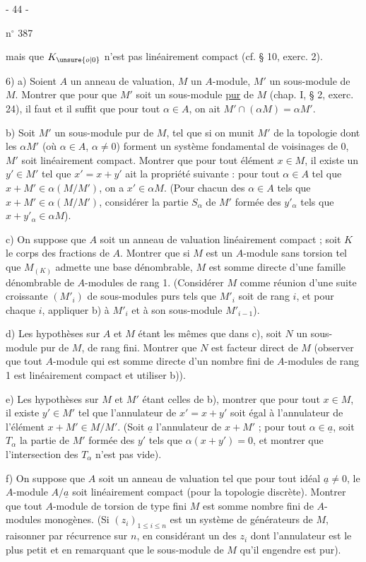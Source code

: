 \begin{center}- 44 -\end{center}
\hfill n$^\circ$ 387

mais que $K_{\unsure{o|0}}$ n'est pas linéairement compact (cf. § 10, exerc. 2).

6) a) Soient $A$ un anneau de valuation, $M$ un $A$-module, $M'$ un sous-module de $M$. Montrer que pour que $M'$ soit un sous-module \uline{pur} de $M$ (chap. I, § 2, exerc. 24), il faut et il suffit que pour tout $\alpha\in A$, on ait $M'\cap(\alpha M)=\alpha M'$.

b) Soit $M'$ un sous-module pur de $M$, tel que si on munit $M'$ de la topologie dont les $\alpha M'$ (où $\alpha\in A$, $\alpha\ne0$) forment un système fondamental de voisinages de $0$, $M'$ soit linéairement compact. Montrer que pour tout élément $x\in M$, il existe un $y'\in M'$ tel que $x'=x+y'$ ait la propriété suivante : pour tout $\alpha\in A$ tel que $x+M'\in\alpha(M/M')$, on a $x'\in\alpha M$. (Pour chacun des $\alpha\in A$ tels que $x+M'\in\alpha(M/M')$, considérer la partie $S_\alpha$ de $M'$ formée des $y'_\alpha$ tels que $x+y'_\alpha\in\alpha M$).

c) On suppose que $A$ soit un anneau de valuation linéairement compact ; soit $K$ le corps des fractions de $A$. Montrer que si $M$ est un $A$-module sans torsion tel que $M_{(K)}$ admette une base dénombrable, $M$ est somme directe d'une famille dénombrable de $A$-modules de rang 1. (Considérer $M$ comme réunion d'une suite croissante $(M'_i)$ de sous-modules purs tels que $M'_i$ soit de rang $i$, et pour chaque $i$, appliquer b) à $M'_i$ et à son sous-module $M'_{i-1}$).

d) Les hypothèses sur $A$ et $M$ étant les mêmes que dans c), soit $N$ un sous-module pur de $M$, de rang fini. Montrer que $N$ est facteur direct de $M$ (observer que tout $A$-module qui est somme directe d'un nombre fini de $A$-modules de rang 1 est linéairement compact et utiliser b)).

e) Les hypothèses sur $M$ et $M'$ étant celles de b), montrer que pour tout $x\in M$, il existe $y'\in M'$ tel que l'annulateur de $x'=x+y'$ soit égal à l'annulateur de l'élément $x+M'\in M/M'$. (Soit $\underline a$ l'annulateur de $x+M'$ ; pour tout $\alpha\in\underline a$, soit $T_\alpha$ la partie de $M'$ formée des $y'$ tels que $\alpha(x+y')=0$, et montrer que l'intersection des $T_\alpha$ n'est pas vide).

f) On suppose que $A$ soit un anneau de valuation tel que pour tout idéal $\underline a\ne0$, le $A$-module $A/\underline a$ soit linéairement compact (pour la topologie discrète). Montrer que tout $A$-module de torsion de type fini $M$ est somme  nombre fini de $A$-modules monogènes. (Si $(z_i)_{1\le i\le n}$ est un système de générateurs de $M$, raisonner par récurrence sur $n$, en considérant un des $z_i$ dont l'annulateur est le plus petit et en remarquant que le sous-module de $M$ qu'il engendre est pur).
